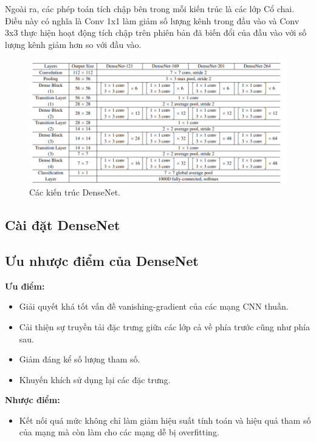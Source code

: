 Ngoài ra, các phép toán tích chập bên trong mỗi kiến trúc là các lớp Cổ chai. Điều này có nghĩa là Conv 1x1 làm giảm số lượng kênh trong đầu vào và Conv 3x3 thực hiện hoạt động tích chập trên phiên bản đã biến đổi của đầu vào với số lượng kênh giảm hơn so với đầu vào.
\begin{figure}[H]
	\centering
	\includegraphics[width=1\linewidth]{images/densenet_archtectures_for_imagenet}
	\caption{Các kiến trúc DenseNet.}
	\label{fig:densenet_archtectures_for_imagenet}
\end{figure}

\subsection{Cài đặt DenseNet}


\subsection{Ưu nhược điểm của DenseNet}
\textbf{Ưu điểm:}
\begin{itemize}
	\item Giải quyết khá tốt vấn đề vanishing-gradient của các mạng CNN thuần.
	\item Cải thiện sự truyền tải đặc trưng giữa các lớp cả về phía trước cũng như phía sau.
	\item Giảm đáng kể số lượng tham số.
	\item Khuyến khích sử dụng lại các đặc trưng.
\end{itemize}
\textbf{Nhược điểm:}
\begin{itemize}
	\item Kết nối quá mức không chỉ làm giảm hiệu suất tính toán và hiệu quả tham số của mạng mà còn làm cho các mạng dễ bị overfitting. \cite{densenet_disadvantage}
\end{itemize}